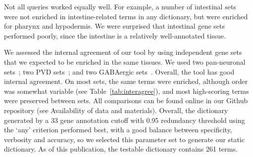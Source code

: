 \documentclass{bmcart}
\begin{document}
Not all queries worked equally well. For example, a number of intestinal  sets~\cite{Spencer2011, Pauli2006} were not enriched in intestine-related terms in any dictionary, but were enriched for pharynx and hypodermis. We were  surprised that intestinal gene sets performed poorly, since the intestine is a relatively well-annotated tissue. 

We assessed the internal agreement of our tool by using independent gene sets that we expected to be enriched in the same tissues. We used two  pan-neuronal sets~\cite{Spencer2011, Watson2008a}; two PVD sets~\cite{Spencer2011, Smith2010}; and two  GABAergic sets~\cite{Spencer2011, Cinar2005}.%
Overall, the tool has good internal agreement. On most sets, the same terms were enriched, although order was somewhat variable (see Table~\ref{tab:interagree}), and most high-scoring terms were preserved between sets. %
All comparisons can be found online in our Github repository (see Availability of data and materials). Overall, the dictionary generated by a 33 gene annotation cutoff with 0.95 redundancy threshold using the `any' criterion performed best, with a good balance between specificity, verbosity and accuracy, so we selected this parameter set to generate our static dictionary. As of this publication, the testable dictionary contains 261 terms. 
\end{document}
